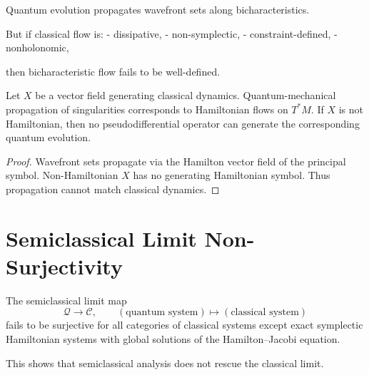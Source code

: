 \documentclass[12pt,oneside]{book}
\begin{document}
Quantum evolution propagates wavefront sets along bicharacteristics.

But if classical flow is:
- dissipative,
- non-symplectic,
- constraint-defined,
- nonholonomic,

then bicharacteristic flow fails to be well-defined.

\begin{theorem}
Let $X$ be a vector field generating classical dynamics.
Quantum-mechanical propagation of singularities corresponds to Hamiltonian flows on $T^*M$.
If $X$ is not Hamiltonian, then no pseudodifferential operator can generate the corresponding quantum evolution.
\end{theorem}

\begin{proof}
Wavefront sets propagate via the Hamilton vector field of the principal symbol.  
Non-Hamiltonian $X$ has no generating Hamiltonian symbol.  
Thus propagation cannot match classical dynamics.
\end{proof}

\section{Semiclassical Limit Non-Surjectivity}

\begin{theorem}
The semiclassical limit map
\[
\mathcal{Q} \to \mathcal{C},\qquad
(\text{quantum system}) \mapsto (\text{classical system})
\]
fails to be surjective for all categories of classical systems except exact symplectic Hamiltonian systems with global solutions of the Hamilton–Jacobi equation.
\end{theorem}

This shows that semiclassical analysis does not rescue the classical limit.
\end{document}
